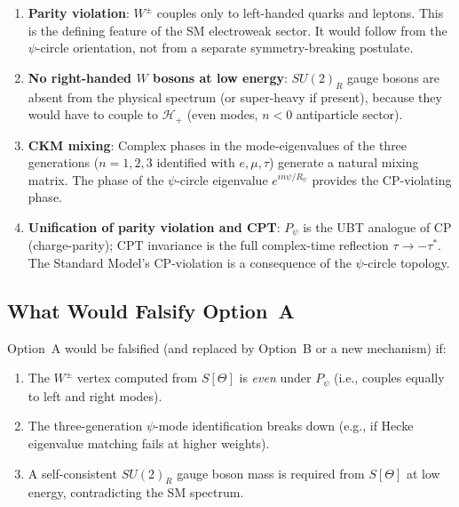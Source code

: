 \documentclass[12pt,a4paper]{article}
\theoremstyle{definition}
\theoremstyle{remark}
\begin{document}
\begin{enumerate}
  \item \textbf{Parity violation}: $W^\pm$ couples only to left-handed quarks
    and leptons.  This is the defining feature of the SM electroweak sector.
    It would follow from the $\psi$-circle orientation, not from a separate
    symmetry-breaking postulate.

  \item \textbf{No right-handed $W$ bosons at low energy}: $SU(2)_R$ gauge
    bosons are absent from the physical spectrum (or super-heavy if present),
    because they would have to couple to $\mathcal{H}_+$ (even modes, $n<0$
    antiparticle sector).

  \item \textbf{CKM mixing}: Complex phases in the mode-eigenvalues of the
    three generations ($n=1,2,3$ identified with $e,\mu,\tau$) generate
    a natural mixing matrix.  The phase of the $\psi$-circle eigenvalue
    $e^{in\psi/R_\psi}$ provides the CP-violating phase.

  \item \textbf{Unification of parity violation and CPT}: $P_\psi$ is the
    UBT analogue of CP (charge-parity); CPT invariance is the full
    complex-time reflection $\tau\to-\tau^*$.  The Standard Model's
    CP-violation is a consequence of the $\psi$-circle topology.
\end{enumerate}

\subsection{What Would Falsify Option~A}
\label{subsec:falsification}

Option~A would be falsified (and replaced by Option~B or a new mechanism) if:
\begin{enumerate}
  \item The $W^\pm$ vertex computed from $S[\Theta]$ is \emph{even} under
    $P_\psi$ (i.e., couples equally to left and right modes).
  \item The three-generation $\psi$-mode identification breaks down
    (e.g., if Hecke eigenvalue matching fails at higher weights).
  \item A self-consistent $SU(2)_R$ gauge boson mass is required from
    $S[\Theta]$ at low energy, contradicting the SM spectrum.
\end{enumerate}
\end{document}
